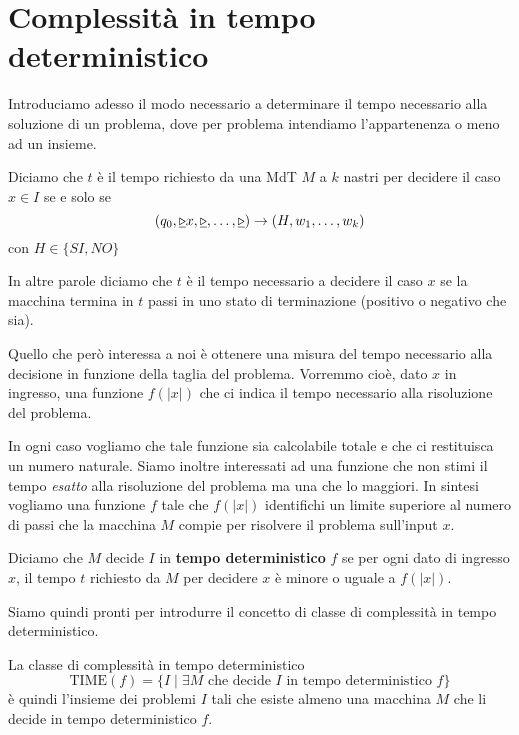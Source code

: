\section{Complessità in tempo deterministico}

Introduciamo adesso il modo necessario a determinare il tempo
necessario alla soluzione di un problema, dove per problema
intendiamo l'appartenenza o meno ad un insieme.

\begin{definition}
	Diciamo che $t$ è il tempo richiesto da una MdT $M$ a $k$
	nastri per decidere il caso $x \in I$ se e solo se
	\[
		(q_0, \underline{\triangleright} x, \underline{\triangleright}, \dots,
		\underline{\triangleright}) \to (H, w_1, \dots, w_k)
	\]
	con $H \in \{ SI, NO \}$
\end{definition}

In altre parole diciamo che $t$ è il tempo necessario a decidere
il caso $x$ se la macchina termina in $t$ passi in uno stato di
terminazione (positivo o negativo che sia).

Quello che però interessa a noi è ottenere una misura del tempo
necessario alla decisione in funzione della taglia del problema.
Vorremmo cioè, dato $x$ in ingresso, una funzione $f(|x|)$ che
ci indica il tempo necessario alla risoluzione del problema.

In ogni caso vogliamo che tale funzione sia calcolabile totale
e che ci restituisca un numero naturale. Siamo inoltre
interessati ad una funzione che non stimi il tempo \emph{esatto}
alla risoluzione del problema ma una che lo maggiori. In sintesi
vogliamo una funzione $f$ tale che $f(|x|)$ identifichi un limite
superiore al numero di passi che la macchina $M$ compie per
risolvere il problema sull'input $x$.

\begin{definition}
	Diciamo che $M$ decide $I$ in \textbf{tempo deterministico}
	$f$ se per ogni dato di ingresso $x$, il tempo $t$ richiesto
	da $M$ per decidere $x$ è minore o uguale a $f(|x|)$.
\end{definition}

Siamo quindi pronti per introdurre il concetto di classe di
complessità in tempo deterministico.

\begin{definition}
	La classe di complessità in tempo deterministico
	\[
		\text{TIME}(f) = \{ I \mid \exists M \text{ che decide }
		I \text{ in tempo deterministico } f \}
	\]
	è quindi l'insieme dei problemi $I$ tali che esiste almeno
	una macchina $M$ che li decide in tempo deterministico $f$.
\end{definition}

